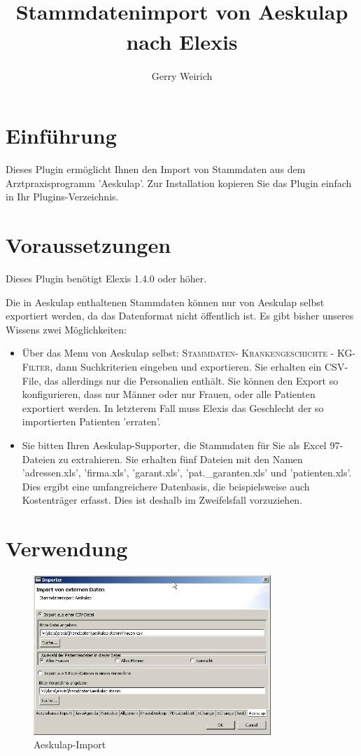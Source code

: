 \documentclass[a4paper]{scrartcl}
\title{Stammdatenimport von Aeskulap nach Elexis\textsuperscript{\textregistered}}
\author{Gerry Weirich}
\begin{document}
\maketitle
\section{Einführung}

Dieses Plugin ermöglicht Ihnen den Import von Stammdaten aus dem Arztpraxisprogramm 'Aeskulap'.
Zur Installation kopieren Sie das Plugin einfach in Ihr Plugins-Verzeichnis.

\section{Voraussetzungen}
Dieses Plugin benötigt Elexis 1.4.0 oder höher.

\medskip

Die in Aeskulap enthaltenen Stammdaten können nur von Aeskulap selbst exportiert werden, da das Datenformat nicht öffentlich ist. Es gibt bisher unseres Wissens zwei Möglichkeiten:
\begin{itemize}
  \item Über das Menu von Aeskulap selbst: \textsc{Stammdaten- Krankengeschichte - KG-Filter}, dann Suchkriterien eingeben und exportieren. Sie erhalten ein CSV-File, das allerdings nur die Personalien enthält. Sie können den Export so konfigurieren, dass nur Männer oder nur Frauen, oder alle Patienten exportiert werden. In letzterem Fall muss Elexis das Geschlecht der so importierten Patienten 'erraten'.
  \item Sie bitten Ihren Aeskulap-Supporter, die Stammdaten für Sie als Excel 97-Dateien zu extrahieren. Sie erhalten fünf Dateien mit den Namen 'adressen.xls', 'firma.xls', 'garant.xls', 'pat.\_garanten.xls' und 'patienten.xls'. Dies ergibt eine umfangreichere Datenbasis, die beispielsweise auch Kostenträger erfasst. Dies ist deshalb im Zweifelsfall vorzuziehen.
\end{itemize}

\section{Verwendung}

\begin{figure}
    \includegraphics[width=0.8\textwidth]{aeskulap}
    \caption{Aeskulap-Import}
    \label{fig:aeskulap}
\end{figure}
\end{document}
